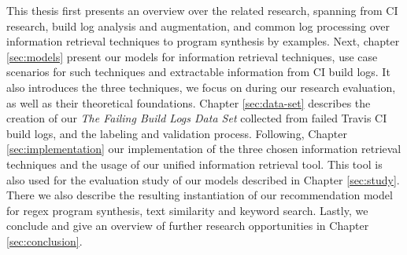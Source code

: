 \documentclass[\myrootdir/main.tex]{subfiles}
\begin{document}
This thesis first presents an overview over the related research, spanning from CI research, build log analysis and augmentation, and common  log processing over information retrieval techniques to program synthesis by examples.
Next, chapter \ref{sec:models} present our models for information retrieval techniques, use case scenarios for such techniques and extractable information from CI build logs. It also introduces the three techniques, we focus on during our research evaluation, as well as their theoretical foundations.
Chapter \ref{sec:data-set} describes the creation of our \emph{The Failing Build Logs Data Set} collected from failed Travis CI build logs, and the labeling and validation process.
Following, Chapter \ref{sec:implementation} our implementation of the three chosen information retrieval techniques and the usage of our unified information retrieval tool.
This tool is also used for the evaluation study of our models described in Chapter \ref{sec:study}. There we also describe the resulting instantiation of our recommendation model for regex program synthesis, text similarity and keyword search.
Lastly, we conclude and give an overview of further research opportunities in Chapter \ref{sec:conclusion}.
\end{document}
